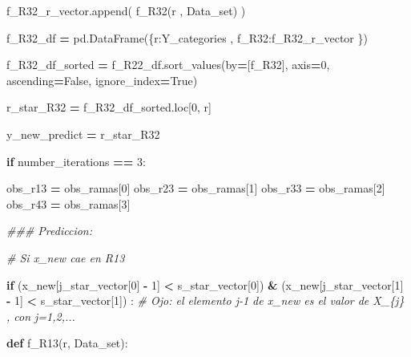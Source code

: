 \documentclass[
  11pt,
  a4paper,
]{article}
\newenvironment{Shaded}{\begin{snugshade}}{\end{snugshade}}
\newcommand{\CommentTok}[1]{\textcolor[rgb]{0.56,0.35,0.01}{\textit{#1}}}
\newcommand{\ControlFlowTok}[1]{\textcolor[rgb]{0.13,0.29,0.53}{\textbf{#1}}}
\newcommand{\DecValTok}[1]{\textcolor[rgb]{0.00,0.00,0.81}{#1}}
\newcommand{\KeywordTok}[1]{\textcolor[rgb]{0.13,0.29,0.53}{\textbf{#1}}}
\newcommand{\NormalTok}[1]{#1}
\newcommand{\OperatorTok}[1]{\textcolor[rgb]{0.81,0.36,0.00}{\textbf{#1}}}
\newcommand{\StringTok}[1]{\textcolor[rgb]{0.31,0.60,0.02}{#1}}
\newcommand{\VariableTok}[1]{\textcolor[rgb]{0.00,0.00,0.00}{#1}}
\begin{document}
\begin{Shaded}
\begin{Highlighting}[]
\NormalTok{                    f\_R32\_r\_vector.append( f\_R32(r , Data\_set) )}

\NormalTok{                f\_R32\_df }\OperatorTok{=}\NormalTok{ pd.DataFrame(\{}\StringTok{\textquotesingle{}r\textquotesingle{}}\NormalTok{:Y\_categories  , }\StringTok{\textquotesingle{}f\_R32\textquotesingle{}}\NormalTok{:f\_R32\_r\_vector \})}
        
\NormalTok{                f\_R32\_df\_sorted }\OperatorTok{=}\NormalTok{ f\_R22\_df.sort\_values(by}\OperatorTok{=}\NormalTok{[}\StringTok{\textquotesingle{}f\_R32\textquotesingle{}}\NormalTok{], axis}\OperatorTok{=}\DecValTok{0}\NormalTok{, ascending}\OperatorTok{=}\VariableTok{False}\NormalTok{, ignore\_index}\OperatorTok{=}\VariableTok{True}\NormalTok{)}

\NormalTok{                r\_star\_R32 }\OperatorTok{=}\NormalTok{ f\_R32\_df\_sorted.loc[}\DecValTok{0}\NormalTok{, }\StringTok{\textquotesingle{}r\textquotesingle{}}\NormalTok{]}


\NormalTok{                y\_new\_predict }\OperatorTok{=}\NormalTok{ r\_star\_R32}


        
    \ControlFlowTok{if}\NormalTok{ number\_iterations }\OperatorTok{==} \DecValTok{3}\NormalTok{:}

\NormalTok{            obs\_r13 }\OperatorTok{=}\NormalTok{ obs\_ramas[}\DecValTok{0}\NormalTok{]}
\NormalTok{            obs\_r23 }\OperatorTok{=}\NormalTok{ obs\_ramas[}\DecValTok{1}\NormalTok{]}
\NormalTok{            obs\_r33 }\OperatorTok{=}\NormalTok{ obs\_ramas[}\DecValTok{2}\NormalTok{]}
\NormalTok{            obs\_r43 }\OperatorTok{=}\NormalTok{ obs\_ramas[}\DecValTok{3}\NormalTok{]}

        \CommentTok{\#\#\# Prediccion:}

            \CommentTok{\# Si x\_new cae en R13}

            \ControlFlowTok{if}\NormalTok{ (x\_new[j\_star\_vector[}\DecValTok{0}\NormalTok{] }\OperatorTok{{-}} \DecValTok{1}\NormalTok{] }\OperatorTok{\textless{}}\NormalTok{ s\_star\_vector[}\DecValTok{0}\NormalTok{]) }\OperatorTok{\&}\NormalTok{ (x\_new[j\_star\_vector[}\DecValTok{1}\NormalTok{] }\OperatorTok{{-}} \DecValTok{1}\NormalTok{] }\OperatorTok{\textless{}}\NormalTok{ s\_star\_vector[}\DecValTok{1}\NormalTok{]) :  }\CommentTok{\# Ojo: el elemento j{-}1 de x\_new es el valor de X\_\{j\} , con j=1,2,...}

                \KeywordTok{def}\NormalTok{ f\_R13(r, Data\_set):}


\end{Highlighting}
\end{Shaded}
\end{document}

